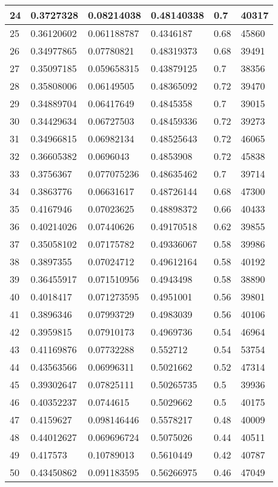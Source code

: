 \begin{longtable}{|l|l|l|l|l|l|}
24 & 0.3727328 & 0.08214038 & 0.48140338 & 0.7 & 40317 \\ \hline 
25 & 0.36120602 & 0.061188787 & 0.4346187 & 0.68 & 45860 \\ \hline 
26 & 0.34977865 & 0.07780821 & 0.48319373 & 0.68 & 39491 \\ \hline 
27 & 0.35097185 & 0.059658315 & 0.43879125 & 0.7 & 38356 \\ \hline 
28 & 0.35808006 & 0.06149505 & 0.48365092 & 0.72 & 39470 \\ \hline 
29 & 0.34889704 & 0.06417649 & 0.4845358 & 0.7 & 39015 \\ \hline 
30 & 0.34429634 & 0.06727503 & 0.48459336 & 0.72 & 39273 \\ \hline 
31 & 0.34966815 & 0.06982134 & 0.48525643 & 0.72 & 46065 \\ \hline 
32 & 0.36605382 & 0.0696043 & 0.4853908 & 0.72 & 45838 \\ \hline 
33 & 0.3756367 & 0.077075236 & 0.48635462 & 0.7 & 39714 \\ \hline 
34 & 0.3863776 & 0.06631617 & 0.48726144 & 0.68 & 47300 \\ \hline 
35 & 0.4167946 & 0.07023625 & 0.48898372 & 0.66 & 40433 \\ \hline 
36 & 0.40214026 & 0.07440626 & 0.49170518 & 0.62 & 39855 \\ \hline 
37 & 0.35058102 & 0.07175782 & 0.49336067 & 0.58 & 39986 \\ \hline 
38 & 0.3897355 & 0.07024712 & 0.49612164 & 0.58 & 40192 \\ \hline 
39 & 0.36455917 & 0.071510956 & 0.4943498 & 0.58 & 38890 \\ \hline 
40 & 0.4018417 & 0.071273595 & 0.4951001 & 0.56 & 39801 \\ \hline 
41 & 0.3896346 & 0.07993729 & 0.4983039 & 0.56 & 40106 \\ \hline 
42 & 0.3959815 & 0.07910173 & 0.4969736 & 0.54 & 46964 \\ \hline 
43 & 0.41169876 & 0.07732288 & 0.552712 & 0.54 & 53754 \\ \hline 
44 & 0.43563566 & 0.06996311 & 0.5021662 & 0.52 & 47314 \\ \hline 
45 & 0.39302647 & 0.07825111 & 0.50265735 & 0.5 & 39936 \\ \hline 
46 & 0.40352237 & 0.0744615 & 0.5029662 & 0.5 & 40175 \\ \hline 
47 & 0.4159627 & 0.098146446 & 0.5578217 & 0.48 & 40009 \\ \hline 
48 & 0.44012627 & 0.069696724 & 0.5075026 & 0.44 & 40511 \\ \hline 
49 & 0.417573 & 0.10789013 & 0.5610449 & 0.42 & 40787 \\ \hline 
50 & 0.43450862 & 0.091183595 & 0.56266975 & 0.46 & 47049 \\ \hline 
\end{longtable}